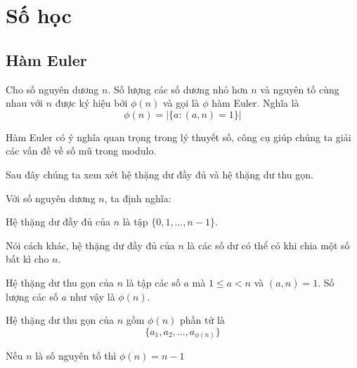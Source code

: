 \chapter{Số học}

\section{Hàm Euler}

\begin{definition}
    Cho số nguyên dương $n$. Số lượng các số dương nhỏ hơn $n$ và nguyên tố cùng nhau với $n$ được ký hiệu bởi $\phi(n)$ và gọi là $\phi$ hàm Euler. Nghĩa là
    \[\phi(n) = | \{ a : (a, n) = 1\} |\]
\end{definition}   

Hàm Euler có ý nghĩa quan trọng trong lý thuyết số, công cụ giúp chúng ta giải các vấn đề về số mũ trong modulo.

Sau đây chúng ta xem xét hệ thặng dư đầy đủ và hệ thặng dư thu gọn.

Với số nguyên dương $n$, ta định nghĩa:

\begin{definition}
    Hệ thặng dư đầy đủ của $n$ là tập $\{0, 1, \ldots, n-1\}$.
\end{definition}

Nói cách khác, hệ thặng dư đầy đủ của $n$ là các số dư có thể có khi chia một số bất kì cho $n$.


\begin{definition}
    Hệ thặng dư thu gọn của $n$ là tập các số $a$ mà $1 \leq a < n$ và $(a, n) = 1$. Số lượng các số $a$ như vậy là $\phi (n)$.  
\end{definition}


\begin{remark}
    Hệ thặng dư thu gọn của $n$ gồm $\phi(n)$ phần tử là $$\{a_1, a_2, \ldots, a_{\phi(n)}\}$$
\end{remark}

\begin{remark}
    Nếu $n$ là số nguyên tố thì $\phi(n) = n-1$
\end{remark}

